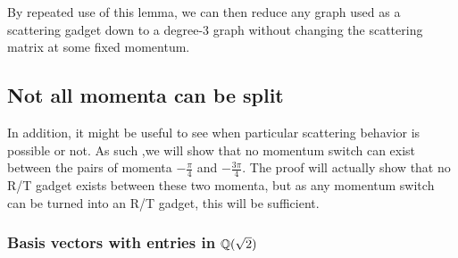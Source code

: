 \documentclass[../thesis-main/thesis-main]{subfiles}
\begin{document}
By repeated use of this lemma, we can then reduce any graph used as a scattering gadget down to a degree-3 graph without changing the scattering matrix at some fixed momentum.



\subsection{Not all momenta can be split}

In addition, it might be useful to see when particular scattering behavior is possible or not.  As such ,we will show that no momentum switch can exist between the pairs of momenta $-\frac{\pi}{4}$ and $-\frac{3\pi}{4}$.  The proof will actually show that no R/T gadget exists between these two momenta, but as any momentum switch can be turned into an R/T gadget, this will be sufficient.


\subsubsection{Basis vectors with entries in $\mathbb{Q}(\sqrt{2})$}
\label{sec:vecs_over_field}
\end{document}
